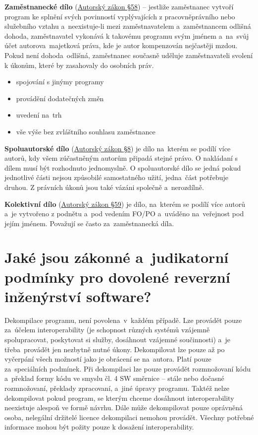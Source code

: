 \textbf{Zaměstnanecké dílo} (\href{https://www.zakonyprolidi.cz/cs/2000-121#p58}{Autorský zákon §58}) -- jestliže zaměstnanec vytvoří program ke splnění svých povinností vyplývajících z pracovněprávního nebo služebního vztahu a~neexistuje-li mezi zaměstnavatelem a~zaměstnancem odlišná dohoda, zaměstnavatel vykonává k takovému programu svým jménem a~na~svůj účet autorova~majetková práva, kde je autor kompenzován nejčastěji mzdou. Pokud není dohoda~odlišná, zaměstnanec současně uděluje zaměstnavateli svolení k úkonům, které by zasahovaly do osobních práv.
\begin{itemize}[noitemsep]
    \item spojování s jinýmy programy
    \item provádění dodatečných změn
    \item uvedení na~trh
    \item vše výše bez zvláštního souhlasu zaměstnance
\end{itemize}

\textbf{Spoluautorské dílo} (\href{https://www.zakonyprolidi.cz/cs/2000-121#p8}{Autorský zákon §8}) je dílo na~kterém se podílí více autorů, kdy všem zúčastněným autorům připadá stejné právo. O nakládaní s dílem musí být rozhodnuto jednomyslně. O spoluautorské dílo se jedná pokud jednotlivé části nejsou způsobilé samostatného užití, jedna~část potřebuje druhou. Z právních úkonů jsou také vázáni společně a~nerozdílně.

\textbf{Kolektivní dílo} (\href{https://www.zakonyprolidi.cz/cs/2000-121#p59}{Autorský zákon §59}) je dílo, na~kterém se podílí více autorů a~je vytvořeno z podnětu a~pod vedením FO/PO a~uváděno na~veřejnost pod jejím jménem. Považují se často za~zaměstnanecká díla.


\section{Jaké jsou zákonné a~judikatorní podmínky pro dovolené reverzní inženýrství software?}

Dekompilace programu, není povolena~v~každém případě. Lze provádět pouze za~účelem interoperability (je schopnost různých systémů vzájemně spolupracovat, poskytovat si služby, dosáhnout vzájemné součinnosti) a~je třeba~provádět jen nezbytně nutné úkony. Dekompilovat lze pouze až po vyčerpání všech možností jako je obrácení se na~autora. Platí pouze za~speciálních podmínek. Při dekompilaci lze pouze provádět rozmnožovaní kódu a~překlad formy kódu ve smyslu čl. 4 SW směrnice -- stále nebo dočasné rozmnožovaní, překlady zpracovaní, a~jiné úpravy programu. Taktéž nelze dekompilovat pokud program, se kterým chceme dosáhnout interoperability neexistuje alespoň ve formě návrhu. Dále může dekompilovat pouze oprávněná osoba, nelegální držitelé licence dekompilaci nemohou provádět. Všechny potřebné informace mohou být požity pouze k dosažení interoperability.

